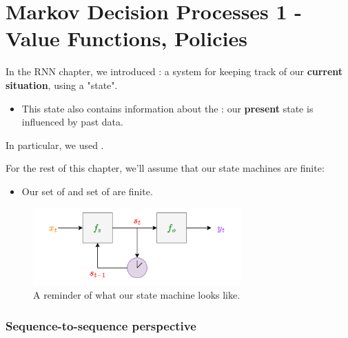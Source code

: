 \setcounter{chapter}{12-1} %

\chapter{Markov Decision Processes 1 - Value Functions, Policies}

\setcounter{section}{0}

    In the RNN chapter, we introduced : a system for keeping track of our \textbf{current situation}, using a "state". 

    \begin{itemize}
        \item This state also contains information about the : our \textbf{present} state is influenced by past data.
    \end{itemize}

    In particular, we used . \\

    \begin{clarification}
        For the rest of this chapter, we'll assume that our state machines are finite:

        \begin{itemize}
            \item Our set of  and set of  are finite.
        \end{itemize}
    \end{clarification}

    \begin{figure}[H]
        \centering
        \includegraphics[width=80mm,scale=0.5]{images/rnn_images/state_machine_diagram.png}
        
        \caption*{A reminder of what our state machine looks like.}
    \end{figure}




    \phantom{}
    
    \subsection{Sequence-to-sequence perspective}

